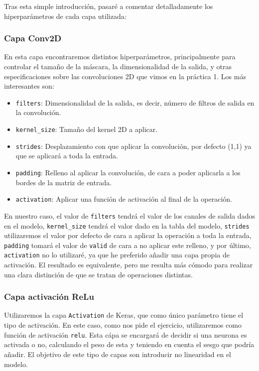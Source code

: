 \documentclass[12pt, spanish]{article}
\begin{document}
Tras esta simple introducción, pasaré a comentar detalladamente los hiperparámetros de cada capa utilizada:

\subsubsection{Capa Conv2D}

En esta capa encontraremos distintos hiperparámetros, principalmente para controlar el tamaño de la máscara, la dimensionalidad de la salida, y otras especificaciones sobre las convoluciones 2D que vimos en la práctica 1. Los más interesantes son:

\begin{itemize}
	\item \texttt{filters}: Dimensionalidad de la salida, es decir, número de filtros de salida en la convolución.
	\item \texttt{kernel\_size}: Tamaño del kernel 2D a aplicar.
	\item \texttt{strides}: Desplazamiento con que aplicar la convolución, por defecto (1,1) ya que se aplicará a toda la entrada.
	\item \texttt{padding}: Relleno al aplicar la convolución, de cara a poder aplicarla a los bordes de la matriz de entrada.
	\item \texttt{activation}: Aplicar una función de activación al final de la operación.

\end{itemize}

En nuestro caso, el valor de \texttt{filters} tendrá el valor de los canales de salida dados en el modelo, \texttt{kernel\_size} tendrá el valor dado en la tabla del modelo, \texttt{strides} utilizaremos el valor por defecto de cara a aplicar la operación a toda la entrada, \texttt{padding} tomará el valor de \texttt{valid} de cara a no aplicar este relleno, y por último, \texttt{activation} no lo utilizaré, ya que he preferido añadir una capa propia de activación. El resultado es equivalente, pero me resulta más cómodo para realizar una clara distinción de que se tratan de operaciones distintas.

\subsubsection{Capa activación ReLu}

Utilizaremos la capa \texttt{Activation} de Keras, que como único parámetro tiene el tipo de activación. En este caso, como nos pide el ejercicio, utilizaremos como función de activación \texttt{relu}. Esta cápa se encargará de decidir si una neurona es activada o no, calculando el peso de esta y teniendo en cuenta el sesgo que podría añadir. El objetivo de este tipo de capas son introducir no linearidad en el modelo.
\end{document}
